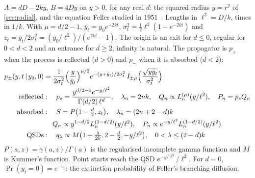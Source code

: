 \documentclass[11pt]{article}
\numberwithin{equation}{section}
\newcommand{\given}{\,|\,}
\begin{document}
\begin{keyresults}
$A=dD-2ky$, $B=4Dy$ on $y>0$, for any real $d$: the squared radius $y=r^2$ of \cref{sec:radial}, and the equation
Feller studied in 1951~\cite{feller51}. Lengths in $\ell^2=D/k$, times in $1/k$. With $\mu=d/2-1$,
$\bar y_t=y_0e^{-2kt}$, $\sigma_t^2=\frac12\ell^2(1-e^{-2kt})$ and $z_t=\bar y_t/2\sigma_t^2=(y_0/\ell^2)/(e^{2kt}-1)$.
The origin is an exit for $d\le0$, regular for $0<d<2$ and an entrance for $d\ge2$; infinity is natural. The
propagator is $p_+$ when the process is reflected ($d>0$) and $p_-$ when it is absorbed ($d<2$):
\begin{align}
  p_\pm(y,t\given y_0,0) &= \frac{1}{2\sigma_t^2}\Bigl(\frac{y}{\bar y_t}\Bigr)^{\mu/2}
  e^{-(y+\bar y_t)/2\sigma_t^2}\,I_{\pm\mu}\Bigl(\frac{\sqrt{y\bar y_t}}{\sigma_t^2}\Bigr) \label{eq:sqrt-p}\\
  \text{reflected} &:\quad p_s=\frac{y^{d/2-1}e^{-y/\ell^2}}{\Gamma(d/2)\,\ell^{d}},\quad \lambda_n=2nk,\quad
  Q_n\propto L_n^{(\mu)}(y/\ell^2),\quad P_n=p_sQ_n \\
  \text{absorbed} &:\quad S=P\bigl(1-\tfrac d2,z_t\bigr),\quad \lambda_n=(2n+2-d)k \\
  &\phantom{:}\quad Q_n\propto y^{1-d/2}L_n^{(1-d/2)}(y/\ell^2),\quad P_n\propto e^{-y/\ell^2}L_n^{(1-d/2)}(y/\ell^2) \\
  \text{QSDs} &:\quad q_\lambda\propto M\bigl(1+\tfrac{\lambda}{2k},2-\tfrac d2,-y/\ell^2\bigr),\quad
  0<\lambda\le(2-d)k
\end{align}
$P(a,z)=\gamma(a,z)/\Gamma(a)$ is the regularised incomplete gamma function and $M$ is Kummer's function. Point starts
reach the QSD $e^{-y/\ell^2}/\ell^2$. For $d=0$, $\Pr(y_t=0)=e^{-z_t}$: the extinction probability of Feller's
branching diffusion.
\end{keyresults}
\end{document}
